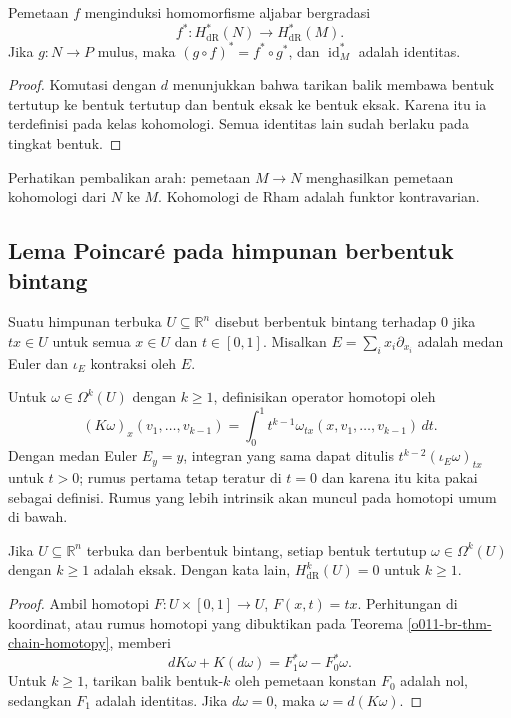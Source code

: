 \begin{Proposition}\label{o011-br-prop-pullback-cohomology}
Pemetaan $f$ menginduksi homomorfisme aljabar bergradasi
\[
 f^*\colon H^*_{\mathrm{dR}}(N)\longrightarrow H^*_{\mathrm{dR}}(M).
\]
Jika $g\colon N\to P$ mulus, maka $(g\circ f)^*=f^*\circ g^*$, dan
$\operatorname{id}_M^*$ adalah identitas.
\end{Proposition}

\begin{proof}
Komutasi dengan $d$ menunjukkan bahwa tarikan balik membawa bentuk tertutup
ke bentuk tertutup dan bentuk eksak ke bentuk eksak. Karena itu ia terdefinisi
pada kelas kohomologi. Semua identitas lain sudah berlaku pada tingkat bentuk.
\end{proof}

Perhatikan pembalikan arah: pemetaan $M\to N$ menghasilkan pemetaan
kohomologi dari $N$ ke $M$. Kohomologi de Rham adalah funktor kontravarian.

\subsection{Lema Poincar\'e pada himpunan berbentuk bintang}

Suatu himpunan terbuka $U\subseteq\mathbb R^n$ disebut berbentuk bintang
terhadap $0$ jika $tx\in U$ untuk semua $x\in U$ dan $t\in[0,1]$. Misalkan
$E=\sum_i x_i\partial_{x_i}$ adalah medan Euler dan $\iota_E$ kontraksi oleh
$E$.

Untuk $\omega\in\Omega^k(U)$ dengan $k\ge1$, definisikan operator homotopi oleh
\[
 (K\omega)_x(v_1,\ldots,v_{k-1})
 =\int_0^1 t^{k-1}\omega_{tx}(x,v_1,\ldots,v_{k-1})\,dt.
\]
Dengan medan Euler $E_y=y$, integran yang sama dapat ditulis
$t^{k-2}(\iota_E\omega)_{tx}$ untuk $t>0$; rumus pertama tetap teratur di
$t=0$ dan karena itu kita pakai sebagai definisi. Rumus yang lebih intrinsik
akan muncul pada homotopi umum di bawah.

\begin{Theorem}\label{o011-br-thm-poincare}
Jika $U\subseteq\mathbb R^n$ terbuka dan berbentuk bintang, setiap bentuk
tertutup $\omega\in\Omega^k(U)$ dengan $k\ge1$ adalah eksak. Dengan kata lain,
$H^k_{\mathrm{dR}}(U)=0$ untuk $k\ge1$.
\end{Theorem}

\begin{proof}
Ambil homotopi $F\colon U\times[0,1]\to U$, $F(x,t)=tx$. Perhitungan di
koordinat, atau rumus homotopi yang dibuktikan pada Teorema
\ref{o011-br-thm-chain-homotopy}, memberi
\[
 dK\omega+K(d\omega)=F_1^*\omega-F_0^*\omega.
\]
Untuk $k\ge1$, tarikan balik bentuk-$k$ oleh pemetaan konstan $F_0$ adalah nol,
sedangkan $F_1$ adalah identitas. Jika $d\omega=0$, maka
$\omega=d(K\omega)$.
\end{proof}


